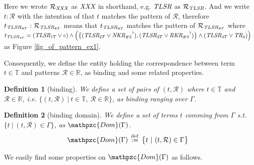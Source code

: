 \documentclass[12pt]{article}
\newtheorem{Definition}{Definition}[section]
\begin{document}
Here we wrote $\mathcal{R}_{\text{\it XXX}}$ as $\text{\it XXX}$ in
shorthand, e.g. $\text{\it TLSR}$ as $\mathcal{R}_{\text{\it TLSR}}$. And
we write $t : \mathcal{R}$ with the intention of that $t$ matches
the pattern of $\mathcal{R}$, therefore
$t_{\text{\it TLSR}_{4T}} : \mathcal{R}_{\text{\it TLSR}_{4T}}$ means that
$t_{\text{\it TLSR}_{4T}}$ matches the pattern of
$\mathcal{R}_{\text{\it TLSR}_{4T}}$ where
$t_{\text{\it TLSR}_{4T}} =
(\text{\it TLSR}_{1T} \vee \circ) \wedge \Bigl(\bigl\{(\text{\it TLSR}_{2T}
\vee {\text{\it NKR}_{\#2}}^?), (\text{\it TLSR}_{3T} \vee {
\text{\it RKR}_{\#3}}^?)\bigr\} \wedge (\text{\it TLSR}_{4T} \vee
\text{\it TR}_{4}) \Bigr)$ as Figure \ref{fig_of_pattern_ex1}.

Consequently, we define the entity holding the correspondence between
term $t \in \mathbb{T}$ and patterns $\mathcal{R} \in \mathbb{R}$, as
binding and some related properties.

\begin{Definition}[binding]
  We define a set of pairs of $(t, \mathcal{R})$ where
  $t \in \mathbb{T}$ and $\mathcal{R} \in \mathbb{R}$, i.e.
  $\bigl\{(t, \mathcal{R}) \ |\ t \in \mathbb{T},\
  \mathcal{R} \in \mathbb{R} \bigr\}$, as binding ranging over $\Gamma$.
\end{Definition}


\begin{Definition}[binding domain]
  We define a set of terms $t$ comming from $\Gamma$ s.t.
  $\bigl\{ t \ |\ (t, \mathcal{R}) \in \Gamma \bigr\}$, as
  $\mathpzc{Dom}(\Gamma)$.
  \[ \mathpzc{Dom}(\Gamma) \,\stackrel{\mathrm{def}}{:=}\,
      \bigl\{ t \ |\ (t, \mathcal{R}) \in \Gamma \bigr\}
  \]
\end{Definition}


We easily find some properties on $\mathpzc{Dom}(\Gamma)$ as follows.
\end{document}
